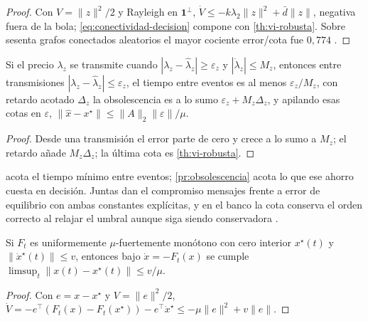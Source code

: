 \begin{proof}
Con $V=\lVert z\rVert^2/2$ y Rayleigh en $\mathbf 1^\perp$,
$\dot V\le-k\lambda_2\lVert z\rVert^2+\bar d\lVert z\rVert$, negativa fuera de
la bola; \eqref{eq:conectividad-decision} compone con \cref{th:vi-robusta}.
Sobre sesenta grafos conectados aleatorios el mayor cociente error/cota fue
$0{,}774$ \cite{mayorga2026compendio}.
\end{proof}

\begin{proposicion}
\label{pr:obsolescencia}
Si el precio $\lambda_z$ se transmite cuando $|\lambda_z-\hat\lambda_z|\ge\varepsilon_z$
y $|\dot\lambda_z|\le M_z$, entonces entre transmisiones
$|\lambda_z-\hat\lambda_z|\le\varepsilon_z$, el tiempo entre eventos es al
menos $\varepsilon_z/M_z$, con retardo acotado $\Delta_z$ la obsolescencia es
a lo sumo $\varepsilon_z+M_z\Delta_z$, y apilando esas cotas en $\varepsilon$,
$\lVert\hat x-x^\star\rVert\le\lVert A\rVert_2\lVert\varepsilon\rVert/\mu$.
\end{proposicion}

\begin{proof}
Desde una transmisión el error parte de cero y crece a lo sumo a $M_z$; el
retardo añade $M_z\Delta_z$; la última cota es \cref{th:vi-robusta}.
\end{proof}

\begin{observacion}
\label{obs:obsolescencia-cierra}
 acota el tiempo mínimo entre eventos; \cref{pr:obsolescencia}
acota lo que ese ahorro cuesta en decisión. Juntas dan el compromiso mensajes
frente a error de equilibrio con ambas constantes explícitas, y en el banco la
cota conserva el orden correcto al relajar el umbral aunque siga siendo
conservadora \cite{mayorga2026compendio}.
\end{observacion}

\begin{proposicion}
\label{pr:equilibrio-movil}
Si $F_t$ es uniformemente $\mu$-fuertemente monótono con cero interior
$x^\star(t)$ y $\lVert\dot x^\star(t)\rVert\le v$, entonces bajo
$\dot x=-F_t(x)$ se cumple $\limsup_t\lVert x(t)-x^\star(t)\rVert\le v/\mu$.
\end{proposicion}

\begin{proof}
Con $e=x-x^\star$ y $V=\lVert e\rVert^2/2$,
$\dot V=-e^{\!\top}(F_t(x)-F_t(x^\star))-e^{\!\top}\dot x^\star\le-\mu\lVert e\rVert^2+v\lVert e\rVert$.
\end{proof}

